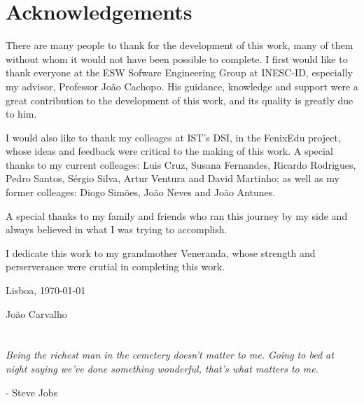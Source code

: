 \chapter*{Acknowledgements}
\thispagestyle{empty}

There are many people to thank for the development of this work, many
of them without whom it would not have been possible to complete. I
first would like to thank everyone at the ESW Sofware Engineering
Group at INESC-ID, especially my advisor, Professor João Cachopo. His
guidance, knowledge and support were a great contribution to the
development of this work, and its quality is greatly due to him.

I would also like to thank my colleages at IST's DSI, in the FenixEdu
project, whose ideas and feedback were critical to the making of this
work. A special thanks to my current colleages: Luis Cruz, Susana
Fernandes, Ricardo Rodrigues, Pedro Santos, Sérgio Silva, Artur
Ventura and David Martinho; as well as my former colleages: Diogo
Simões, João Neves and João Antunes.

A special thanks to my family and friends who ran this journey by my
side and always believed in what I was trying to accomplish.

I dedicate this work to my grandmother Veneranda, whose strength and
perserverance were crutial in completing this work.


\vfill
\begin{flushright}
  \begin{minipage}{8cm}
    \begin{center}
      Lisboa, \today

      Jo\~ao Carvalho
    \end{center}
  \end{minipage}
\end{flushright}

\newpage
\thispagestyle{empty}

\cleardoublepage


\chapter*{}
\thispagestyle{empty}

\vfill
\mbox{}
\vfill\large
\begin{flushright}
  \begin{minipage}{8cm}
    \begin{center}
      {\it Being the richest man in the cemetery doesn't matter to me. Going to bed at night saying we've done something wonderful, that's what matters to me.}
    \end{center}
    \begin{flushright}
      - Steve Jobs
    \end{flushright}
  \end{minipage}
\end{flushright}
\normalsize\vfill
\newpage
\thispagestyle{empty}


